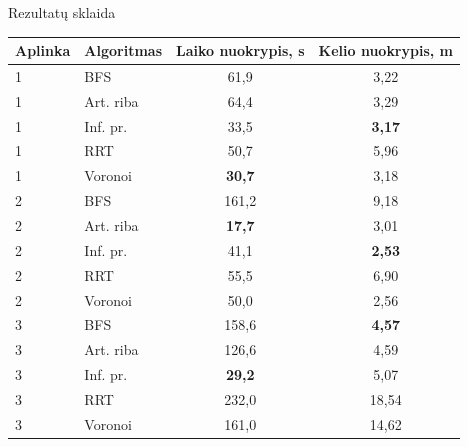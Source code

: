 \documentclass[12pt]{beamer}
\newcommand{\metricbest}[1]{\textbf{#1}}
\begin{document}
\begin{frame}{Rezultatų sklaida}
    \begin{table}
        \centering
        \tiny
        \begin{tabular}{llcc}
            \toprule
            \textbf{Aplinka} & \textbf{Algoritmas} & \textbf{Laiko nuokrypis, s} & \textbf{Kelio nuokrypis, m} \\
            \midrule
            1 & BFS & 61,9 & 3,22 \\
            1 & Art. riba & 64,4 & 3,29 \\
            1 & Inf. pr. & 33,5 & \metricbest{3,17} \\
            1 & RRT & 50,7 & 5,96 \\
            1 & Voronoi & \metricbest{30,7} & 3,18 \\
            \midrule
            2 & BFS & 161,2 & 9,18 \\
            2 & Art. riba & \metricbest{17,7} & 3,01 \\
            2 & Inf. pr. & 41,1 & \metricbest{2,53} \\
            2 & RRT & 55,5 & 6,90 \\
            2 & Voronoi & 50,0 & 2,56 \\
            \midrule
            3 & BFS & 158,6 & \metricbest{4,57} \\
            3 & Art. riba & 126,6 & 4,59 \\
            3 & Inf. pr. & \metricbest{29,2} & 5,07 \\
            3 & RRT & 232,0 & 18,54 \\
            3 & Voronoi & 161,0 & 14,62 \\
            \bottomrule
        \end{tabular}
    \end{table}
\end{frame}
\end{document}
